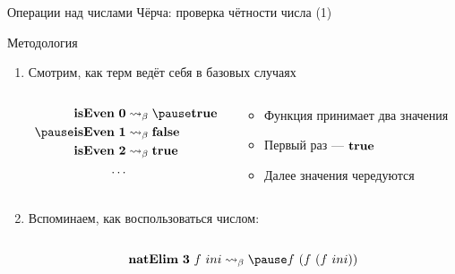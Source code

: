     \begin{frame}{Операции над числами Чёрча: проверка чётности числа (1)}
        \begin{block}{Методология}
            \begin{enumerate}
                \item \pause Смотрим, как терм ведёт себя в базовых случаях
                \vspace{-1em}
                \begin{columns}[onlytextwidth]
                    \begin{column}[t]{0.46\textwidth}
                        \vspace{-0.5em}
                        \begin{align*}
                            \term{isEven}~\term{0}& \step_\beta \pause \term{true} \\ \pause
                            \term{isEven}~\term{1}& \step_\beta \term{false} \\
                            \term{isEven}~\term{2}& \step_\beta \term{true} \\
                            \ldots
                        \end{align*}
                    \end{column}\hfill%
                    \begin{column}[t]{0.51\textwidth}
                        \begin{itemize}
                            \item \pause Функция принимает два значения
                            \item \pause Первый раз --- $\mathbf{true}$
                            \item \pause Далее значения чередуются
                        \end{itemize}
                    \end{column}
                \end{columns}
                \item \pause Вспоминаем, как воспользоваться числом: \pause
                \begin{columns}[onlytextwidth]
                    \begin{column}{0.46\textwidth}
                        \[
                            \term{natElim} \ap \term{3} \ap f \ap ini \step_{\beta} \pause f \ap (f \ap (f \ap ini))
                        \]
                    \end{column}\hfill%

\end{columns}
\end{enumerate}
\end{block}
\end{frame}
